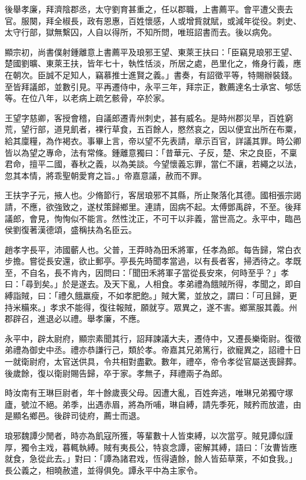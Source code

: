 \begin{pinyinscope}
後舉孝廉，拜濟陰郡丞，太守劉育甚重之，任以郡職，上書薦平。會平遭父喪去官。服闋，拜全椒長，政有恩惠，百姓懷感，人或增貲就賦，或減年從役。刺史、太守行部，獄無繫囚，人自以得所，不知所問，唯班詔書而去。後以病免。

顯宗初，尚書僕射鍾離意上書薦平及琅邪王望、東萊王扶曰：「臣竊見琅邪王望、楚國劉曠、東萊王扶，皆年七十，執性恬淡，所居之處，邑里化之，脩身行義，應在朝次。臣誠不足知人，竊慕推士進賢之義。」書奏，有詔徵平等，特賜辦裝錢。至皆拜議郎，並數引見。平再遷侍中，永平三年，拜宗正，數薦達名士承宮、郇恁等。在位八年，以老病上疏乞骸骨，卒於家。

王望字慈卿，客授會稽，自議郎遷青州刺史，甚有威名。是時州郡災旱，百姓窮荒，望行部，道見飢者，裸行草食，五百餘人，愍然哀之，因以便宜出所在布粟，給其廩糧，為作褐衣。事畢上言，帝以望不先表請，章示百官，詳議其罪。時公卿皆以為望之專命，法有常條。鍾離意獨曰：「昔華元、子反，楚、宋之良臣，不稟君命，擅平二國，春秋之義，以為美談。今望懷義忘罪，當仁不讓，若繩之以法，忽其本情，將乖聖朝愛育之旨。」帝嘉意議，赦而不罪。

王扶字子元，掖人也。少脩節行，客居琅邪不其縣，所止聚落化其德。國相張宗謁請，不應，欲強致之，遂杖策歸鄉里。連請，固病不起。太傅鄧禹辟，不至。後拜議郎，會見，恂恂似不能言。然性沈正，不可干以非義，當世高之。永平中，臨邑侯劉復著漢德頌，盛稱扶為名臣云。

趙孝字長平，沛國蘄人也。父普，王莽時為田禾將軍，任孝為郎。每告歸，常白衣步擔。嘗從長安還，欲止郵亭。亭長先時聞孝當過，以有長者客，掃洒待之。孝既至，不自名，長不肯內，因問曰：「聞田禾將軍子當從長安來，何時至乎？」孝曰：「尋到矣。」於是遂去。及天下亂，人相食。孝弟禮為餓賊所得，孝聞之，即自縛詣賊，曰：「禮久餓羸瘦，不如孝肥飽。」賊大驚，並放之，謂曰：「可且歸，更持米糒來。」孝求不能得，復往報賊，願就亨。眾異之，遂不害。鄉黨服其義。州郡辟召，進退必以禮。舉孝廉，不應。

永平中，辟太尉府，顯宗素聞其行，詔拜諫議大夫，遷侍中，又遷長樂衛尉。復徵弟禮為御史中丞。禮亦恭謙行己，類於孝。帝嘉其兄弟篤行，欲寵異之，詔禮十日一就衛尉府，太官送供具，令共相對盡歡。數年，禮卒，帝令孝從官屬送喪歸葬。後歲餘，復以衛尉賜告歸，卒于家。孝無子，拜禮兩子為郎。

時汝南有王琳巨尉者，年十餘歲喪父母。因遭大亂，百姓奔逃，唯琳兄弟獨守塚廬，號泣不絕。弟季，出遇赤眉，將為所哺，琳自縛，請先季死，賊矜而放遣，由是顯名鄉邑。後辟司徒府，薦士而退。

琅邪魏譚少閒者，時亦為飢寇所獲，等輩數十人皆束縛，以次當亨。賊見譚似謹厚，獨令主戏，暮輒執縛。賊有夷長公，特哀念譚，密解其縛，語曰：「汝曹皆應就食，急從此去。」對曰：「譚為諸君戏，恆得遺餘，餘人皆茹草萊，不如食我。」長公義之，相曉赦遣，並得俱免。譚永平中為主家令。


\end{pinyinscope}
